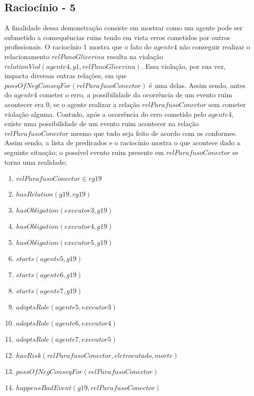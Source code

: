 \subsection{Raciocínio - 5} 
\label{raciocinio5}
A finalidade dessa demonstração consiste em mostrar como um agente pode ser submetido a consequências ruins tendo em vista erros cometidos por outros profissionais. O raciocínio 1 mostra que o fato do $agente4$ não conseguir realizar o relacionamento $relPanoGlicerina$ resulta na violação $relationViol(agente4,g1,relPanoGlicerina)$. Essa violação, por sua vez, impacta diversas outras relações, em que $possOfNegConseqFor(relParafusoConector)$ é uma delas. Assim sendo, antes do $agente4$ cometer o erro, a possibilidade da ocorrência de um evento ruim acontecer era 0, se o agente realizar a relação $relParafusoConector$ sem cometer violação alguma. Contudo, após a ocorrência do erro cometido pelo $agente4$, existe uma possibilidade de um evento ruim acontecer na relação $relParafusoConector$ mesmo que tudo seja feito de acordo com os conformes. Assim sendo, a lista de predicados e o raciocínio mostra o que acontece dado a seguinte situação; o possível evento ruim presente em $relParafusoConector$ se torna uma realidade;  

\begin{enumerate}
	\item $relParafusoConector \in rg19$	
	\item $hasRelation(g19,rg19)$		
	\item $hasObligation(executor3,g19)$
	\item $hasObligation(executor4,g19)$
	\item $hasObligation(executor5,g19)$		
	\item $starts(agente5,g19)$
	\item $starts(agente6,g19)$
	\item $starts(agente7,g19)$									
	\item $adoptsRole(agente5,executor3)$
	\item $adoptsRole(agente6,executor4)$
	\item $adoptsRole(agente7,executor5)$
	\item $hasRisk(relParafusoConector,eletrocutado,morte)$
	\item $possOfNegConseqFor(relParafusoConector)$
	\item $happensBadEvent(g19,relParafusoConector)$	
\end{enumerate}


